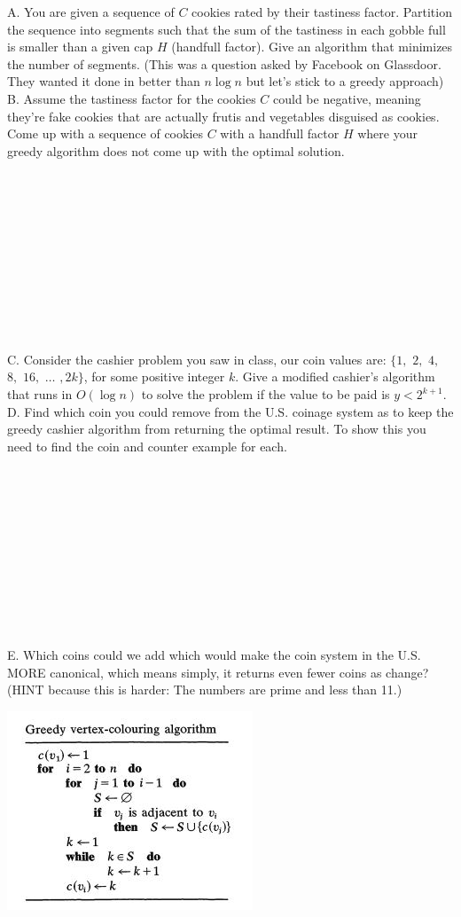 \documentclass[12pt]{article}
\begin{document}
\noindent A. You are given a sequence of $C$ cookies rated by their tastiness factor. Partition the sequence into segments such that the sum of the tastiness in each gobble full is smaller than a given cap $H$ (handfull factor). Give an algorithm that minimizes the number of segments. (This was a question asked by Facebook on Glassdoor. They wanted it done in better than $n \log{n}$ but let's stick to a greedy approach)
\newpage \noindent B. Assume the tastiness factor for the cookies $C$ could be negative, meaning they're fake cookies that are actually frutis and vegetables disguised as cookies. Come up with a sequence of cookies $C$ with a handfull factor $H$ where your greedy algorithm does not come up with the optimal solution.\\\\\\\\\\\\\\\\\\\\\\\\
C. Consider the cashier problem you saw in class, our coin values are:
$\{1,$ $2,$ $4,$ $8,$ $16,$ $\dots$ $,2k\}$, for some positive integer $k$. Give a modified cashier's algorithm that runs in $O(\log{n})$
to solve the problem if the value to be paid is $y < 2^{k+1}$.
\newpage
\noindent D. Find which coin you could remove from the U.S. coinage system as to keep the greedy cashier algorithm
from returning the optimal result. To show this you need to find the coin and counter example for each.\\\\\\\\\\\\\\\\\\\\\\\\
E. Which coins could we add which would make the coin system in the U.S. MORE canonical, which means simply, it returns even fewer coins as change? (HINT because this is harder:
The numbers are prime and less than 11.)
\newpage
\noindent \centerline{\includegraphics[scale = 1]{greedycolour.jpg}}
\end{document}
